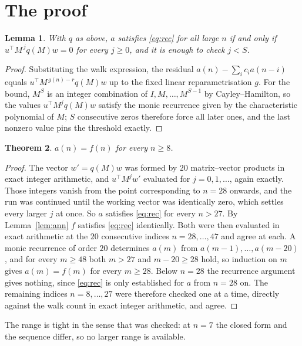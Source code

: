 \documentclass[11pt,a4paper]{article}
\theoremstyle{plain}
\newtheorem{theorem}{Theorem}
\newtheorem{lemma}[theorem]{Lemma}
\theoremstyle{definition}
\begin{document}
\section{The proof}

\begin{lemma}\label{lem:crit}
With $q$ as above, $a$ satisfies \eqref{eq:rec} for all large $n$ if and only if
$u^{\!\top}M^{\,j}q(M)w=0$ for every $j\ge0$, and it is enough to check $j<S$.
\end{lemma}

\begin{proof}
Substituting the walk expression, the residual $a(n)-\sum_ic_ia(n-i)$ equals
$u^{\!\top}M^{\,g(n)-r}q(M)w$ up to the fixed linear reparametrisation $g$. For the bound,
$M^{S}$ is an integer combination of $I,M,\dots,M^{S-1}$ by Cayley--Hamilton, so the values
$u^{\!\top}M^{j}q(M)w$ satisfy the monic recurrence given by the characteristic polynomial of
$M$; $S$ consecutive zeros therefore force all later ones, and the last nonzero value pins the
threshold exactly.
\end{proof}

\begin{theorem}
$a(n)=f(n)$ for every $n\ge8$.
\end{theorem}

\begin{proof}
The vector $w'=q(M)w$ was formed by $20$ matrix--vector products in exact integer
arithmetic, and $u^{\!\top}M^{j}w'$ evaluated for $j=0,1,\dots$, again exactly. Those integers
vanish from the point corresponding to $n=28$ onwards, and the run was continued until the
working vector was identically zero, which settles every larger $j$ at once. So $a$ satisfies
\eqref{eq:rec} for every $n>27$. By Lemma~\ref{lem:ann} $f$ satisfies \eqref{eq:rec}
identically. Both were then evaluated in exact arithmetic at the $20$ consecutive indices
$n=28,\dots,47$ and agree at each. A monic recurrence of order $20$
determines $a(m)$ from $a(m-1),\dots,a(m-20)$, and for every $m\ge48$ both
$m>27$ and $m-20\ge28$ hold, so induction on $m$ gives $a(m)=f(m)$ for every
$m\ge28$.
Below $n=28$ the recurrence argument gives nothing, since \eqref{eq:rec} is only
established for $a$ from $n=28$ on. The remaining indices $n=8,\dots,27$ were
therefore checked one at a time, directly against the walk count in exact integer arithmetic,
and agree.
\end{proof}

The range is tight in the sense that was checked: at $n=7$ the closed form and the sequence differ, so no larger range is available.
\end{document}

